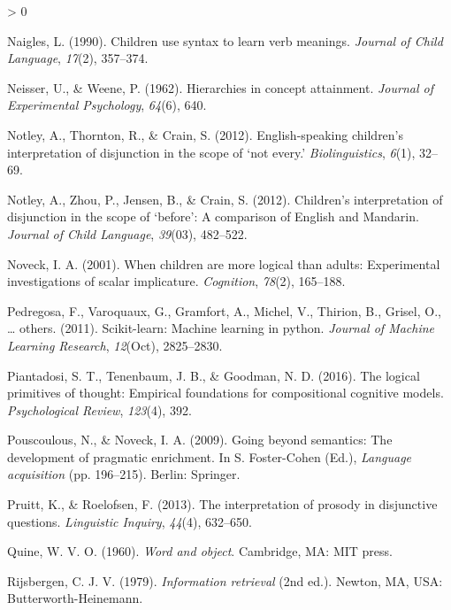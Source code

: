 \documentclass[
  english,
  ,man,floatsintext]{apa6}
\newlength{\cslhangindent}
\newenvironment{CSLReferences}[2] %
 {%
  \setlength{\parindent}{0pt}
  \ifodd #1 \everypar{\setlength{\hangindent}{\cslhangindent}}\ignorespaces\fi
  \ifnum #2 > 0
  \setlength{\parskip}{#2\baselineskip}
  \fi
 }%
 {}
\begin{document}
\begin{CSLReferences}{1}{0}
\leavevmode\hypertarget{ref-naigles1990children}{}%
Naigles, L. (1990). Children use syntax to learn verb meanings. \emph{Journal of Child Language}, \emph{17}(2), 357--374.

\leavevmode\hypertarget{ref-neisser1962hierarchies}{}%
Neisser, U., \& Weene, P. (1962). Hierarchies in concept attainment. \emph{Journal of Experimental Psychology}, \emph{64}(6), 640.

\leavevmode\hypertarget{ref-notley2012notevery}{}%
Notley, A., Thornton, R., \& Crain, S. (2012). English-speaking children's interpretation of disjunction in the scope of {`not every.'} \emph{Biolinguistics}, \emph{6}(1), 32--69.

\leavevmode\hypertarget{ref-notley2012children}{}%
Notley, A., Zhou, P., Jensen, B., \& Crain, S. (2012). Children's interpretation of disjunction in the scope of {`before'}: A comparison of {English} and {M}andarin. \emph{Journal of Child Language}, \emph{39}(03), 482--522.

\leavevmode\hypertarget{ref-noveck2001children}{}%
Noveck, I. A. (2001). When children are more logical than adults: Experimental investigations of scalar implicature. \emph{Cognition}, \emph{78}(2), 165--188.

\leavevmode\hypertarget{ref-pedregosa2011scikit}{}%
Pedregosa, F., Varoquaux, G., Gramfort, A., Michel, V., Thirion, B., Grisel, O., \ldots{} others. (2011). Scikit-learn: Machine learning in python. \emph{Journal of Machine Learning Research}, \emph{12}(Oct), 2825--2830.

\leavevmode\hypertarget{ref-piantadosi2016logical}{}%
Piantadosi, S. T., Tenenbaum, J. B., \& Goodman, N. D. (2016). The logical primitives of thought: Empirical foundations for compositional cognitive models. \emph{Psychological Review}, \emph{123}(4), 392.

\leavevmode\hypertarget{ref-pouscoulous2009going}{}%
Pouscoulous, N., \& Noveck, I. A. (2009). Going beyond semantics: The development of pragmatic enrichment. In S. Foster-Cohen (Ed.), \emph{Language acquisition} (pp. 196--215). Berlin: Springer.

\leavevmode\hypertarget{ref-pruitt2013interpretation}{}%
Pruitt, K., \& Roelofsen, F. (2013). The interpretation of prosody in disjunctive questions. \emph{Linguistic Inquiry}, \emph{44}(4), 632--650.

\leavevmode\hypertarget{ref-quine1960word}{}%
Quine, W. V. O. (1960). \emph{Word and object}. Cambridge, MA: MIT press.

\leavevmode\hypertarget{ref-Rijsbergen1979}{}%
Rijsbergen, C. J. V. (1979). \emph{Information retrieval} (2nd ed.). Newton, MA, USA: Butterworth-Heinemann.


\end{CSLReferences}
\end{document}
